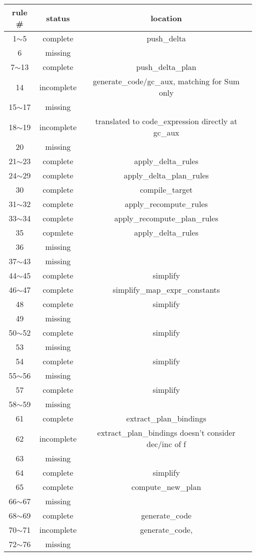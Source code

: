 \documentclass{article}
\begin{document}
\begin{tabular} {|c|c|c|}
\hline rule \# & status & location  \\
\hline 1$\sim$5 & complete & push\_delta \\
\hline 6 & missing & \\
\hline 7$\sim$13 & complete & push\_delta\_plan\\
\hline 14 & incomplete & generate\_code/gc\_aux, matching for Sum only\\
\hline 15$\sim$17 & missing & \\
\hline 18$\sim$19 & incomplete & translated to code\_expression directly at gc\_aux\\
\hline 20 & missing & \\
\hline 21$\sim$23 & complete & apply\_delta\_rules\\
\hline 24$\sim$29 & complete & apply\_delta\_plan\_rules\\
\hline 30 & complete & compile\_target\\
\hline 31$\sim$32 & complete & apply\_recompute\_rules\\
\hline 33$\sim$34 & complete & apply\_recompute\_plan\_rules\\
\hline 35 & copmlete & apply\_delta\_rules\\
\hline 36 & missing & \\
\hline 37$\sim$43 & missing & \\
\hline 44$\sim$45 & complete & simplify \\
\hline 46$\sim$47 & complete & simplify\_map\_expr\_constants \\
\hline 48 & complete & simplify \\
\hline 49 & missing & \\
\hline 50$\sim$52 & complete & simplify \\
\hline 53 & missing & \\
\hline 54 & complete & simplify \\
\hline 55$\sim$56 & missing & \\
\hline 57 & complete & simplify \\
\hline 58$\sim$59 & missing & \\
\hline 61 & complete & extract\_plan\_bindings\\
\hline 62 & incomplete & extract\_plan\_bindings doesn't consider dec/inc of f\\
\hline 63 & missing & \\
\hline 64 & complete & simplify \\
\hline 65 & complete & compute\_new\_plan\\
\hline 66$\sim$67 & missing & \\
\hline 68$\sim$69 & complete & generate\_code\\
\hline 70$\sim$71 & incomplete & generate\_code, \\
\hline 72$\sim$76 & missing & \\
\hline

\end{tabular}
\pagebreak
\end{document}
